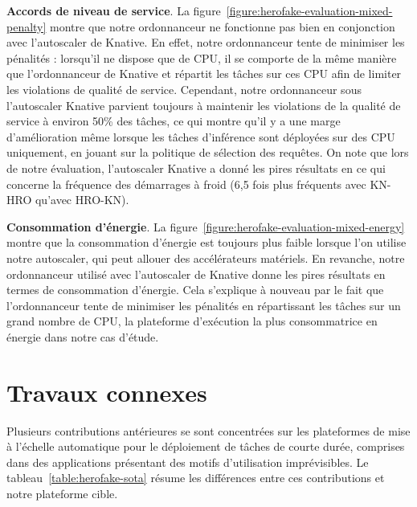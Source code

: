 \textbf{Accords de niveau de service}. La figure~\ref{figure:herofake-evaluation-mixed-penalty} montre que notre ordonnanceur ne fonctionne pas bien en conjonction avec l'autoscaler de Knative. En effet, notre ordonnanceur tente de minimiser les pénalités : lorsqu'il ne dispose que de CPU, il se comporte de la même manière que l'ordonnanceur de Knative et répartit les tâches sur ces CPU afin de limiter les violations de qualité de service. Cependant, notre ordonnanceur sous l'autoscaler Knative parvient toujours à maintenir les violations de la qualité de service à environ 50\% des tâches, ce qui montre qu'il y a une marge d'amélioration même lorsque les tâches d'inférence sont déployées sur des CPU uniquement, en jouant sur la politique de sélection des requêtes. On note que lors de notre évaluation, l'autoscaler Knative a donné les pires résultats en ce qui concerne la fréquence des démarrages à froid (6,5 fois plus fréquents avec KN-HRO qu'avec HRO-KN).

\textbf{Consommation d'énergie}. La figure~\ref{figure:herofake-evaluation-mixed-energy} montre que la consommation d'énergie est toujours plus faible lorsque l'on utilise notre autoscaler, qui peut allouer des accélérateurs matériels. En revanche, notre ordonnanceur utilisé avec l'autoscaler de Knative donne les pires résultats en termes de consommation d'énergie. Cela s'explique à nouveau par le fait que l'ordonnanceur tente de minimiser les pénalités en répartissant les tâches sur un grand nombre de CPU, la plateforme d'exécution la plus consommatrice en énergie dans notre cas d'étude.

\section{Travaux connexes}
\label{section:herofake-sota}

Plusieurs contributions antérieures se sont concentrées sur les plateformes de mise à l'échelle automatique pour le déploiement de tâches de courte durée, comprises dans des applications présentant des motifs d'utilisation imprévisibles. Le tableau~\ref{table:herofake-sota} résume les différences entre ces contributions et notre plateforme cible.

